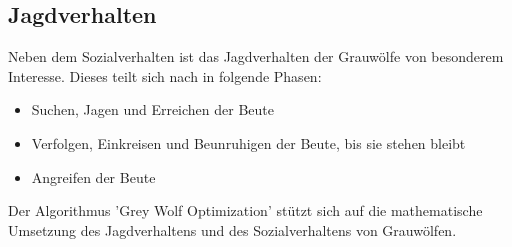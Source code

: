 \subsection{Jagdverhalten}
Neben dem Sozialverhalten ist das Jagdverhalten der Grauwölfe von besonderem Interesse. Dieses teilt sich nach \cite[vgl. Mirjalili 2014, S.5]{MIRJALILI201446} in folgende Phasen: 
\begin{itemize}
    \item Suchen, Jagen und Erreichen der Beute
    \item Verfolgen, Einkreisen und Beunruhigen der Beute, bis sie stehen bleibt
    \item Angreifen der Beute 
\end{itemize}
Der Algorithmus 'Grey Wolf Optimization' stützt sich auf die mathematische Umsetzung des Jagdverhaltens und des Sozialverhaltens von Grauwölfen.
